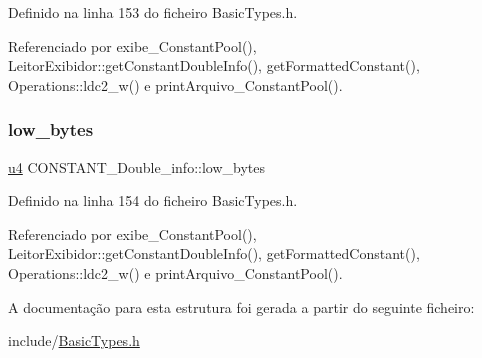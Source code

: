Definido na linha 153 do ficheiro Basic\+Types.\+h.



Referenciado por exibe\+\_\+\+Constant\+Pool(), Leitor\+Exibidor\+::get\+Constant\+Double\+Info(), get\+Formatted\+Constant(), Operations\+::ldc2\+\_\+w() e print\+Arquivo\+\_\+\+Constant\+Pool().

\mbox{\label{structCONSTANT__Double__info_acb94347bd17a80b4a11d6ee35ae1eee3}} 
\subsubsection{\texorpdfstring{low\+\_\+bytes}{low\_bytes}}
{\footnotesize\ttfamily \hyperlink{BasicTypes_8h_ae5be1f726785414dd1b77d60df074c9d}{u4} C\+O\+N\+S\+T\+A\+N\+T\+\_\+\+Double\+\_\+info\+::low\+\_\+bytes}



Definido na linha 154 do ficheiro Basic\+Types.\+h.



Referenciado por exibe\+\_\+\+Constant\+Pool(), Leitor\+Exibidor\+::get\+Constant\+Double\+Info(), get\+Formatted\+Constant(), Operations\+::ldc2\+\_\+w() e print\+Arquivo\+\_\+\+Constant\+Pool().



A documentação para esta estrutura foi gerada a partir do seguinte ficheiro\+:\begin{DoxyCompactItemize}
\item 
include/\hyperlink{BasicTypes_8h}{Basic\+Types.\+h}\end{DoxyCompactItemize}
